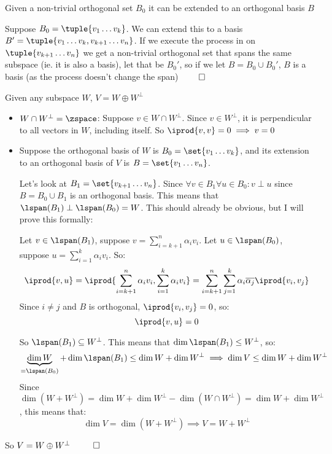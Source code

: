 \documentclass[10pt]{article}
\begin{document}
\begin{lemma}{Given a non-trivial orthogonal set $B_0$ it can be extended to an orthogonal basis $B$}

Suppose $B_0=\tuple{v_1\dots v_k}$. We can extend this to a basis $B'=\tuple{v_1\dots v_k,v_{k+1}\dots v_n}$. If we execute the process in  on $\tuple{v_{k+1}\dots v_n}$ we get a non-trivial orthogonal set that spans the same subspace (ie. it is also a basis), let that be $B_0'$, so if we let $B=B_0\cup B_0'$, $B$ is a basis (as the process doesn't change the span) $\qed$

\end{lemma}

\begin{theorem}[orthSpaceSumThm]{Given any subspace $W$, $V=W\oplus W^\perp$}

\begin{itemize}
    \item $W\cap W^\perp=\zspace$: Suppose $v\in W\cap W^\perp$. Since $v\in W^\perp$, it is perpendicular to all vectors in $W$, including itself. So $\iprod{v,v}=0\implies v=0$
    \item Suppose the orthogonal basis of $W$ is $B_0=\set{v_1\dots v_k}$, and its extension to an orthogonal basis of $V$ is $B=\set{v_1\dots v_n}$. 
    
    Let's look at $B_1=\set{v_{k+1}\dots v_n}$. Since $\forall v\in B_1 \forall u\in B_0: v\perp u$ since $B=B_0\cup B_1$ is an orthogonal basis. This means that $\lspan(B_1)\perp\lspan(B_0)=W$. This should already be obvious, but I will prove this formally:
    
    Let $v\in\lspan(B_1)$, suppose $v=\displaystyle\sum_{i=k+1}^n\alpha_i v_i$. Let $u\in\lspan(B_0)$, suppose $u=\displaystyle\sum_{i=1}^k\alpha_i v_i$. So:
    \[ \iprod{v,u} = \iprod{\sum_{i=k+1}^n\alpha_i v_i, \sum_{i=1}^k\alpha_i v_i} = \sum_{i=k+1}^n\sum_{j=1}^k\alpha_i\overline{\alpha_j}\iprod{v_i,v_j} \]
    Since $i\neq j$ and $B$ is orthogonal, $\iprod{v_i,v_j}=0$, so:
    \[ \iprod{v,u} = 0 \]
    
    So $\lspan(B_1)\subseteq W^\perp$. This means that $\dim\lspan(B_1)\leq W^\perp$, so:
    \[ \underbrace{\dim W}_{=\lspan(B_0)} + \dim\lspan(B_1) \leq \dim W + \dim W^\perp \implies \dim V \leq \dim W + \dim W^\perp \]
    Since $\dim(W+W^\perp) = \dim W + \dim W^\perp - \dim(W\cap W^\perp) = \dim W + \dim W^\perp$, this means that:
    \[ \dim V = \dim(W+W^\perp) \implies V = W+W^\perp \]
\end{itemize}

So $V=W\oplus W^\perp ~~ \qed$

\end{theorem}
\end{document}
